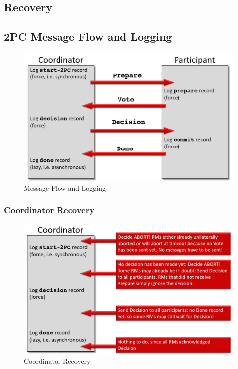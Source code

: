 			
		\subsection{Recovery}
			\subsection{2PC Message Flow and Logging}
				\begin{figure}[h!]
					\includegraphics[scale=0.25]{res/message-flow_logging.jpg}
					\caption{Message Flow and Logging}
				\end{figure}
			\subsubsection{Coordinator Recovery}
				\begin{figure}[h!]
					\includegraphics[scale=0.25]{res/coordinator_recovery.jpg}
					\caption{Coordinator Recovery}
				\end{figure}
			
